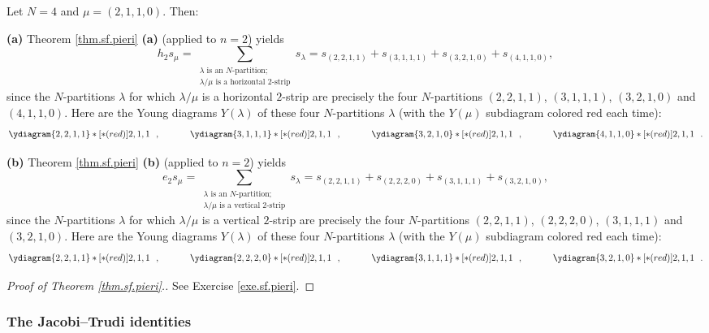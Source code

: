 \begin{example}
Let $N=4$ and $\mu=\left(  2,1,1,0\right)  $. Then: \medskip

\textbf{(a)} Theorem \ref{thm.sf.pieri} \textbf{(a)} (applied to $n=2$) yields%
\[
h_{2}s_{\mu}=\sum_{\substack{\lambda\text{ is an }N\text{-partition;}%
\\\lambda/\mu\text{ is a horizontal }2\text{-strip}}}s_{\lambda}=s_{\left(
2,2,1,1\right)  }+s_{\left(  3,1,1,1\right)  }+s_{\left(  3,2,1,0\right)
}+s_{\left(  4,1,1,0\right)  },
\]
since the $N$-partitions $\lambda$ for which $\lambda/\mu$ is a horizontal
$2$-strip are precisely the four $N$-partitions $\left(  2,2,1,1\right)  $,
$\left(  3,1,1,1\right)  $, $\left(  3,2,1,0\right)  $ and $\left(
4,1,1,0\right)  $. Here are the Young diagrams $Y\left(  \lambda\right)  $ of
these four $N$-partitions $\lambda$ (with the $Y\left(  \mu\right)  $
subdiagram colored red each time):%
\[
\ydiagram{2,2,1,1} *[*(red)]{2,1,1}\ \ ,\ \ \ \ \ \ \ \ \ \ \ydiagram{3,1,1,1}
*[*(red)]{2,1,1}\ \ ,\ \ \ \ \ \ \ \ \ \ \ydiagram{3,2,1,0} *[*(red)]{2,1,1}%
\ \ ,\ \ \ \ \ \ \ \ \ \ \ydiagram{4,1,1,0} *[*(red)]{2,1,1}\ \ .
\]


\textbf{(b)} Theorem \ref{thm.sf.pieri} \textbf{(b)} (applied to $n=2$)
yields
\[
e_{2}s_{\mu}=\sum_{\substack{\lambda\text{ is an }N\text{-partition;}%
\\\lambda/\mu\text{ is a vertical }2\text{-strip}}}s_{\lambda}=s_{\left(
2,2,1,1\right)  }+s_{\left(  2,2,2,0\right)  }+s_{\left(  3,1,1,1\right)
}+s_{\left(  3,2,1,0\right)  },
\]
since the $N$-partitions $\lambda$ for which $\lambda/\mu$ is a vertical
$2$-strip are precisely the four $N$-partitions $\left(  2,2,1,1\right)  $,
$\left(  2,2,2,0\right)  $, $\left(  3,1,1,1\right)  $ and $\left(
3,2,1,0\right)  $. Here are the Young diagrams $Y\left(  \lambda\right)  $ of
these four $N$-partitions $\lambda$ (with the $Y\left(  \mu\right)  $
subdiagram colored red each time):%
\[
\ydiagram{2,2,1,1} *[*(red)]{2,1,1}\ \ ,\ \ \ \ \ \ \ \ \ \ \ydiagram{2,2,2,0}
*[*(red)]{2,1,1}\ \ ,\ \ \ \ \ \ \ \ \ \ \ydiagram{3,1,1,1} *[*(red)]{2,1,1}%
\ \ ,\ \ \ \ \ \ \ \ \ \ \ydiagram{3,2,1,0} *[*(red)]{2,1,1}\ \ .
\]

\end{example}

\begin{proof}
[Proof of Theorem \ref{thm.sf.pieri}.]See Exercise \ref{exe.sf.pieri}.
\end{proof}

\subsubsection{The Jacobi--Trudi identities}

